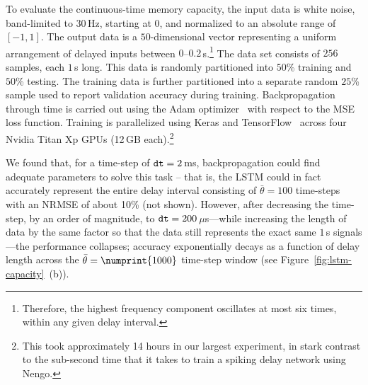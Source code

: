 To evaluate the continuous-time memory capacity, the input data is white noise, band-limited to $30$\,Hz, starting at $0$, and normalized to an absolute range of $[-1, 1]$.
The output data is a $50$-dimensional vector representing a uniform arrangement of delayed inputs between $0$--$0.2$\,s.\footnote{%
Therefore, the highest frequency component oscillates at most six times, within any given delay interval.
}
The data set consists of $256$ samples, each $1$\,s long.
This data is randomly partitioned into $50$\% training and $50$\% testing.
The training data is further partitioned into a separate random $25$\% sample used to report validation accuracy during training.
Backpropagation through time is carried out using the Adam optimizer~\citep{kingma2014adam} with respect to the MSE loss function.
Training is parallelized using Keras and TensorFlow~\citep{abadi2016tensorflow} across four Nvidia Titan Xp GPUs (12\,GB each).\footnote{%
This took approximately 14 hours in our largest experiment, in stark contrast to the sub-second time that it takes to train a spiking delay network using Nengo.}


We found that, for a time-step of $\texttt{dt}{} = 2$\,ms, backpropagation could find adequate parameters to solve this task -- that is, the LSTM could in fact accurately represent the entire delay interval consisting of $\bar{\theta} = 100$ time-steps with an NRMSE of about 10\% (not shown).
However, after decreasing the time-step, by an order of magnitude, to $\texttt{dt}{} = 200$\,$\mu$s---while increasing the length of data by the same factor so that the data still represents the exact same $1$\,s signals---the performance collapses; accuracy exponentially decays as a function of delay length across the $\bar{\theta} = \numprint{1000}$ time-step window (see Figure~\ref{fig:lstm-capacity}~(b)).


